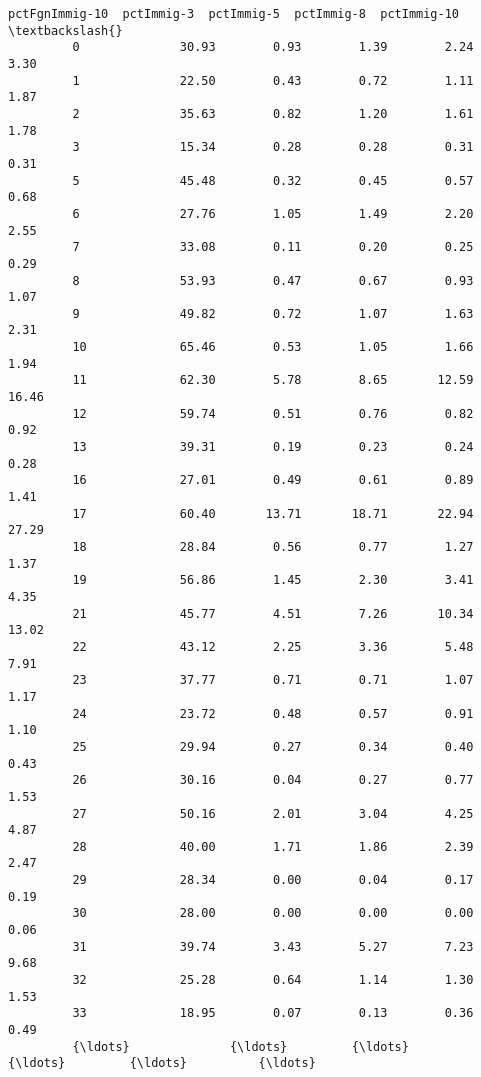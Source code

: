 \documentclass[11pt]{llncs}
\begin{document}
\begin{Verbatim}[commandchars=\\\{\}]
               pctFgnImmig-10  pctImmig-3  pctImmig-5  pctImmig-8  pctImmig-10  \textbackslash{}
         0              30.93        0.93        1.39        2.24         3.30   
         1              22.50        0.43        0.72        1.11         1.87   
         2              35.63        0.82        1.20        1.61         1.78   
         3              15.34        0.28        0.28        0.31         0.31   
         5              45.48        0.32        0.45        0.57         0.68   
         6              27.76        1.05        1.49        2.20         2.55   
         7              33.08        0.11        0.20        0.25         0.29   
         8              53.93        0.47        0.67        0.93         1.07   
         9              49.82        0.72        1.07        1.63         2.31   
         10             65.46        0.53        1.05        1.66         1.94   
         11             62.30        5.78        8.65       12.59        16.46   
         12             59.74        0.51        0.76        0.82         0.92   
         13             39.31        0.19        0.23        0.24         0.28   
         16             27.01        0.49        0.61        0.89         1.41   
         17             60.40       13.71       18.71       22.94        27.29   
         18             28.84        0.56        0.77        1.27         1.37   
         19             56.86        1.45        2.30        3.41         4.35   
         21             45.77        4.51        7.26       10.34        13.02   
         22             43.12        2.25        3.36        5.48         7.91   
         23             37.77        0.71        0.71        1.07         1.17   
         24             23.72        0.48        0.57        0.91         1.10   
         25             29.94        0.27        0.34        0.40         0.43   
         26             30.16        0.04        0.27        0.77         1.53   
         27             50.16        2.01        3.04        4.25         4.87   
         28             40.00        1.71        1.86        2.39         2.47   
         29             28.34        0.00        0.04        0.17         0.19   
         30             28.00        0.00        0.00        0.00         0.06   
         31             39.74        3.43        5.27        7.23         9.68   
         32             25.28        0.64        1.14        1.30         1.53   
         33             18.95        0.07        0.13        0.36         0.49   
         {\ldots}              {\ldots}         {\ldots}         {\ldots}         {\ldots}          {\ldots}   

\end{Verbatim}
\end{document}
